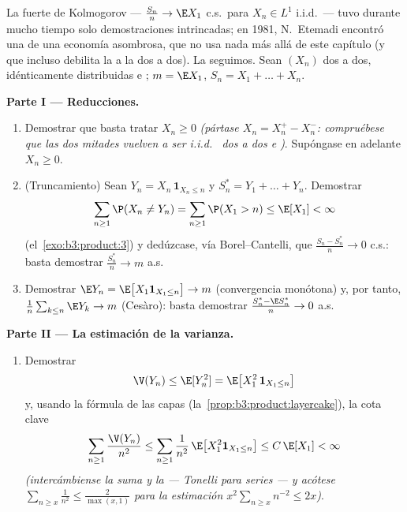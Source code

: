 \begin{problem}
\label{pb:b3:probability:1}
La  fuerte de Kolmogorov ---
$\frac{S_n}n \to \E X_1$ c.s.\ para $X_n \in L^1$ i.i.d.\ --- tuvo
durante mucho tiempo solo demostraciones intrincadas; en 1981,
N.~Etemadi encontró una de una economía asombrosa, que no usa nada más
allá de este capítulo (y que incluso debilita la
 a la
 dos a dos). La
seguimos. Sean $(X_n)$
 dos a dos,
idénticamente distribuidas e ;
$m = \E X_1$, $S_n = X_1 + \dots + X_n$.

\medskip
\noindent\textbf{Parte I --- Reducciones.}
\begin{enumerate}
  \item Demostrar que basta tratar $X_n \geq 0$ \emph{(pártase
  $X_n = X_n^+ - X_n^-$: compruébese que las dos mitades vuelven a ser
  i.i.d.\  dos a
  dos e )}. Supóngase en
  adelante $X_n \geq 0$. \item (Truncamiento) Sean
  $Y_n = X_n\,\mathbf 1_{X_n \leq n}$ y $S_n^* = Y_1 + \dots + Y_n$.
  Demostrar
        \[
        \sum_{n\geq1}\P(X_n \neq Y_n) =
        \sum_{n\geq1}\P(X_1 > n) \leq \E[X_1] < \infty
        \]
        (el~\cref{exo:b3:product:3}) y dedúzcase, vía Borel--Cantelli,
        que $\frac{S_n - S_n^*}{n} \to 0$ c.s.: basta demostrar
        $\frac{S^*_n}n \to m$
        a.s.
  \item Demostrar $\E Y_n = \E\bigl[X_1\mathbf 1_{X_1\leq
        n}\bigr] \to m$ (convergencia monótona) y, por tanto,
  $\frac1n\sum_{k\leq n}\E Y_k \to m$ (Cesàro): basta demostrar
  $\frac{S_n^* - \E S_n^*}{n} \to 0$
        a.s.
\end{enumerate}

\medskip
\noindent\textbf{Parte II --- La estimación de la varianza.}
\begin{enumerate}[resume]
  \item Demostrar
        \[
        \V(Y_n) \leq \E[Y_n^2] = \E\bigl[X_1^2\,\mathbf
        1_{X_1 \leq n}\bigr]
        \]
        y, usando la fórmula de las capas
        (la~\cref{prop:b3:product:layercake}), la cota clave
        \[
        \sum_{n\geq1}\frac{\V(Y_n)}{n^2}
        \leq \sum_{n\geq1}\frac1{n^2}\,
        \E\bigl[X_1^2\mathbf 1_{X_1\leq n}\bigr]
        \leq C\,\E[X_1] < \infty
        \]
        \emph{(intercámbiense la suma y la
         --- Tonelli para
        series --- y acótese $\sum_{n \geq
        x}\frac1{n^2} \leq \frac2{\max(x,1)}$ para la estimación
         $x^2\sum_{n\geq x}n^{-2} \leq 2x$)}.
\end{enumerate}


\end{problem}

